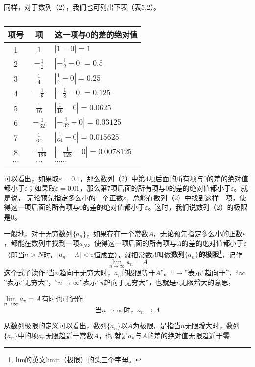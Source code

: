 同样，对于数列（2），我们也可列出下表（表5.2）。
\begin{table}[htp]
    \caption{}
    \centering
\begin{tabular}{ccl}
    \hline
    项号& 项 & 这一项与0的差的绝对值 \\
    \hline
1   & $1$   & $\left|1-0\right|=1$\\
2   & $-\frac{1}{2}$   & $\left|-\frac{1}{2}-0\right|=0.5$\\ [1.5ex]
3   &$\frac{1}{4}$   & $\left|\frac{1}{4}-0\right|=0.25$\\ [1.5ex]
4   &$-\frac{1}{8}$   & $\left|-\frac{1}{8}-0\right|=0.125$\\ [1.5ex]
5   &$\frac{1}{16}$   & $\left|\frac{1}{16}-0\right|=0.0625$\\ [1.5ex]
6   &$-\frac{1}{32}$   & $\left|-\frac{1}{32}-0\right|=0.03125$\\ [1.5ex]
7   &$\frac{1}{64}$   & $\left|\frac{1}{64}-0\right|=0.015625$\\ [1.5ex]
8   &$-\frac{1}{128}$   & $\left|-\frac{1}{128}-0\right|=0.0078125$\\ [1.5ex]
$\cdots$   & $\cdots$   & $\cdots\cdots$   \\ 
\hline
\end{tabular}
\end{table}


可以看出，如果取$\varepsilon=0.1$，那么数列（2）中第4项后面的所有项与0的差的绝对值都小于$\varepsilon$；如果取$\varepsilon=0.01$，那么第7项后面的所有项与0的差的绝对值都小于$\varepsilon$。就是说，
无论预先指定多么小的一个正数$\varepsilon$，总能在数列（2）中找到这样一项，使得这一项后面的所有项与0的差的绝对值都小于$\varepsilon$。这时，我们说数列（2）的极限是0。

一般地，对于无穷数列$\{a_n\}$，如果存在一个常数$A$，无论预先指定多么小的正数$\varepsilon$，都能在数列中找到一项$a_N$，使得这一项后面的所有项与$A$的差的绝对值都小于$\varepsilon$（即当$n>N$时，$|a_n-A|<\varepsilon$恒成立），就把常数$A$叫做\textbf{数列$\{a_n\}$的极限}\footnote{lim的英文limit（极限）的头三个字母。}，记作
\[\lim_{n\to\infty}a_n=A\]
这个式子读作“当$n$趋向于无穷大时，$a_n$的极限等于$A$”。“$\to $”表示“趋向于”，“$\infty$”表示“无穷大”，“$n\to\infty$”表示“$n$趋向于无穷大”，也就是$n$无限增大的意思。

$\lim\limits_{n\to \infty}a_n=A$有时也可记作
\[\text{当$n\to\infty$时，}a_n\to A\]

从数列极限的定义可以看出，数列$\{a_n\}$以$A$为极限，是指当$n$无限增大时，数列$\{a_n\}$中的项$a_n$无限趋近于常数$A$，也
就是$a_n$与$A$的差的绝对值无限趋近于零.

